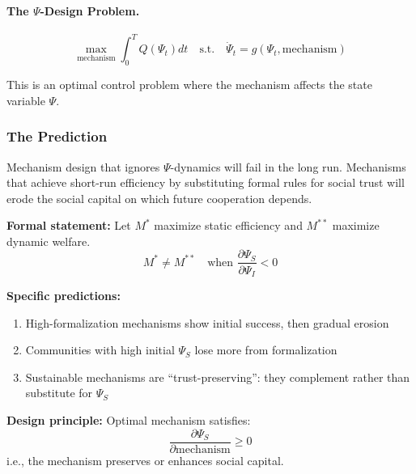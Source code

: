 \paragraph{The $\Psi$-Design Problem.}

\begin{equation}
\max_{\text{mechanism}} \int_0^T Q(\Psi_t) dt \quad \text{s.t.} \quad \dot{\Psi}_t = g(\Psi_t, \text{mechanism})
\label{eq:psi-design}
\end{equation}

This is an optimal control problem where the mechanism affects the state variable $\Psi$.

\subsubsection{The Prediction}

\begin{tcolorbox}[colback=blue!5!white, colframe=blue!75!black, title=Prediction 8: Mechanism-Context Dynamics]
Mechanism design that ignores $\Psi$-dynamics will fail in the long run. 
Mechanisms that achieve short-run efficiency by substituting formal rules 
for social trust will erode the social capital on which future cooperation depends.

\textbf{Formal statement:}
Let $M^*$ maximize static efficiency and $M^{**}$ maximize dynamic welfare.
\begin{equation}
M^* \neq M^{**} \quad \text{when } \frac{\partial \Psi_S}{\partial \Psi_I} < 0
\end{equation}

\textbf{Specific predictions:}
\begin{enumerate}
  \item High-formalization mechanisms show initial success, then gradual erosion
  \item Communities with high initial $\Psi_S$ lose more from formalization
  \item Sustainable mechanisms are ``trust-preserving'': they complement rather than substitute for $\Psi_S$
\end{enumerate}

\textbf{Design principle:} Optimal mechanism satisfies:
\begin{equation}
\frac{\partial \Psi_S}{\partial \text{mechanism}} \geq 0
\end{equation}
i.e., the mechanism preserves or enhances social capital.
\end{tcolorbox}

